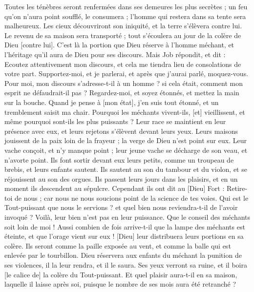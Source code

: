 \begin{multicols}{2}
Toutes les ténèbres seront renfermées dans ses demeures les plus secrètes ; un feu qu'on n'aura point soufflé, le consumera ; l'homme qui restera dans sa tente sera malheureux.
Les cieux découvriront son iniquité, et la terre s'élèvera contre lui.
Le revenu de sa maison sera transporté ; tout s'écoulera au jour de la colère de Dieu [contre lui].
C'est là la portion que Dieu réserve à l'homme méchant, et l'héritage qu'il aura de Dieu pour ses discours.
\VerseOne{}Mais Job répondit, et dit :
Ecoutez attentivement mon discours, et cela me tiendra lieu de consolations de votre part.
Supportez-moi, et je parlerai, et après que j'aurai parlé, moquez-vous.
Pour moi, mon discours s'adresse-t-il à un homme ? si cela était, comment mon esprit ne défaudrait-il pas ?
Regardez-moi, et soyez étonnés, et mettez la main sur la bouche.
Quand je pense à [mon état], j'en suis tout étonné, et un tremblement saisit ma chair.
Pourquoi les méchants vivent-ils, [et] vieillissent, et même pourquoi sont-ils les plus puissants ?
Leur race se maintient en leur présence avec eux, et leurs rejetons s'élèvent devant leurs yeux.
Leurs maisons jouissent de la paix loin de la frayeur ; la verge de Dieu n'est point sur eux.
Leur vache conçoit, et n'y manque point ; leur jeune vache se décharge de son veau, et n'avorte point.
Ils font sortir devant eux leurs petits, comme un troupeau de brebis, et leurs enfants sautent.
Ils sautent au son du tambour et du violon, et se réjouissent au son des orgues.
Ils passent leurs jours dans les plaisirs, et en un moment ils descendent au sépulcre.
Cependant ils ont dit au [Dieu] Fort : Retire-toi de nous ; car nous ne nous soucions point de la science de tes voies.
Qui est le Tout-puissant que nous le servions ? et quel bien nous reviendra-t-il de l'avoir invoqué ?
Voilà, leur bien n'est pas en leur puissance. Que le conseil des méchants soit loin de moi !
Aussi combien de fois arrive-t-il que la lampe des méchants est éteinte, et que l'orage vient sur eux ! [Dieu] leur distribuera leurs portions en sa colère.
Ils seront comme la paille exposée au vent, et comme la balle qui est enlevée par le tourbillon.
Dieu réservera aux enfants du méchant la punition de ses violences, il la leur rendra, et il le saura.
Ses yeux verront sa ruine, et il boira [le calice de] la colère du Tout-puissant.
Et quel plaisir aura-t-il en sa maison, laquelle il laisse après soi, puisque le nombre de ses mois aura été retranché ?

\end{multicols}
